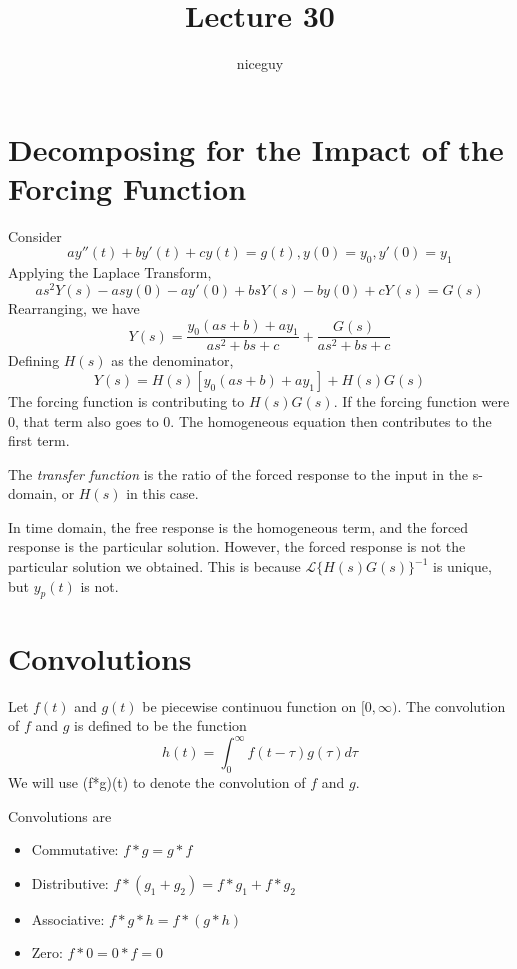 \documentclass[12pt]{article}
\title{Lecture 30}
\author{niceguy}
\begin{document}
\maketitle

\section{Decomposing for the Impact of the Forcing Function}

Consider
$$ay''(t) + by'(t) + cy(t) = g(t), y(0) = y_0, y'(0) = y_1$$
Applying the Laplace Transform,
$$as^2Y(s) - asy(0) - ay'(0) + bsY(s) - by(0) + cY(s) = G(s)$$
Rearranging, we have
$$Y(s) = \frac{y_0(as+b) + ay_1}{as^2 + bs + c} + \frac{G(s)}{as^2 + bs + c}$$
Defining $H(s)$ as the denominator,
$$Y(s) = H(s)[y_0(as+b)+ay_1] + H(s)G(s)$$
The forcing function is contributing to $H(s)G(s)$. If the forcing function were $0$, that term also goes to $0$. The homogeneous equation then contributes to the first term.

\begin{defn}
	The \emph{transfer function} is the ratio of the forced response to the input in the s-domain, or $H(s)$ in this case.
\end{defn}

In time domain, the free response is the homogeneous term, and the forced response is the particular solution. However, the forced response is not the particular solution we obtained. This is because $\mathcal{L}\{H(s)G(s)\}^{-1}$ is unique, but $y_p(t)$ is not.

\section{Convolutions}

\begin{defn}
	Let $f(t)$ and $g(t)$ be piecewise continuou function on $[0,\infty)$. The convolution of $f$ and $g$ is defined to be the function
	$$h(t) = \int_0^\infty f(t-\tau)g(\tau)d\tau$$
	We will use (f*g)(t) to denote the convolution of $f$ and $g$.
\end{defn}

Convolutions are
\begin{itemize}
	\item Commutative: $f*g = g*f$
	\item Distributive: $f*(g_1+g_2) = f*g_1 + f*g_2$
	\item Associative: $f*g*h = f*(g*h)$
	\item Zero: $f*0 = 0*f = 0$
\end{itemize}
\end{document}
